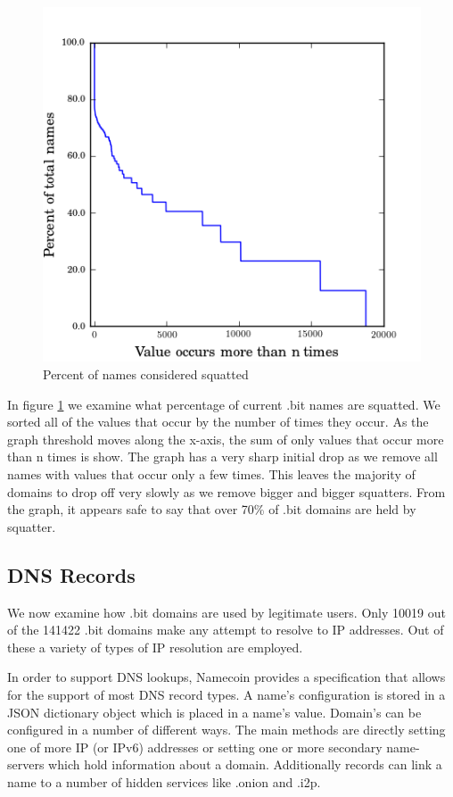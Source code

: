 \begin{figure}
  \centering
  \includegraphics[width=0.9\columnwidth]{figures/squatters}
  \caption{Percent of names considered squatted}
  \label{fig:percentSquatter}
\end{figure}

In figure \ref{fig:percentSquatter} we examine what percentage of current .bit names are squatted. We sorted all of the values that occur by the number of times they occur. As the graph threshold moves along the x-axis, the sum of only values that occur more than n times is show. The graph has a very sharp initial drop as we remove all names with values that occur only a few times. This leaves the majority of domains to drop off very slowly as we remove bigger and bigger squatters. From the graph, it appears safe to say that over 70\% of .bit domains are held by squatter.

\subsection{DNS Records}

We now examine how .bit domains are used by legitimate users. Only 10019 out of the 141422 .bit domains make any attempt to resolve to IP addresses. Out of these a variety of types of IP resolution are employed.

In order to support DNS lookups, Namecoin provides a specification that allows for the support of most DNS record types. A name's configuration is stored in a JSON dictionary object which is placed in a name's value. Domain's can be configured in a number of different ways. The main methods are directly setting one of more IP (or IPv6) addresses or setting one or more secondary name-servers which hold information about a domain. Additionally records can link a name to a number of hidden services like .onion\cite{onion} and .i2p\cite{i2p}.

